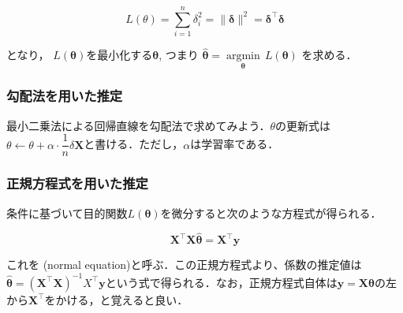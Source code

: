\begin{equation}
L(\theta)=\sum_{i=1}^n \delta_i^2 = \|\mathbf{\delta}\|^2=\mathbf{\delta}^\top \mathbf{\delta}
\end{equation}


となり， $L(\mathbf{\theta})$を最小化する$\mathbf{\theta}$, つまり $\hat {\mathbf {\theta }}={\underset {\mathbf {\theta}}{\operatorname {arg min} }}\,L({\mathbf{\theta}})$
を求める．
\subsubsection{勾配法を用いた推定}
最小二乗法による回帰直線を勾配法で求めてみよう．$\theta$の更新式は$\theta \leftarrow \theta + \alpha\cdot \dfrac{1}{n} \delta \mathbf{X}$と書ける．ただし，$\alpha$は学習率である．






\subsubsection{正規方程式を用いた推定}
条件に基づいて目的関数$L(\mathbf{\theta})$を微分すると次のような方程式が得られる．


\begin{equation}
\mathbf{X}^\top\mathbf{X}\mathbf{\hat\theta}=\mathbf{X}^\top\mathbf{y}
\end{equation}


これを\textbf{} (normal equation)と呼ぶ．この正規方程式より、係数の推定値は$\mathbf{\hat\theta}={(\mathbf{X}^\top\mathbf{X})}^{-1}X^\top\mathbf{y}$という式で得られる．なお，正規方程式自体は$\mathbf{y}=\mathbf{X}\mathbf{\theta}$の左から$\mathbf{X}^\top$をかける，と覚えると良い．



